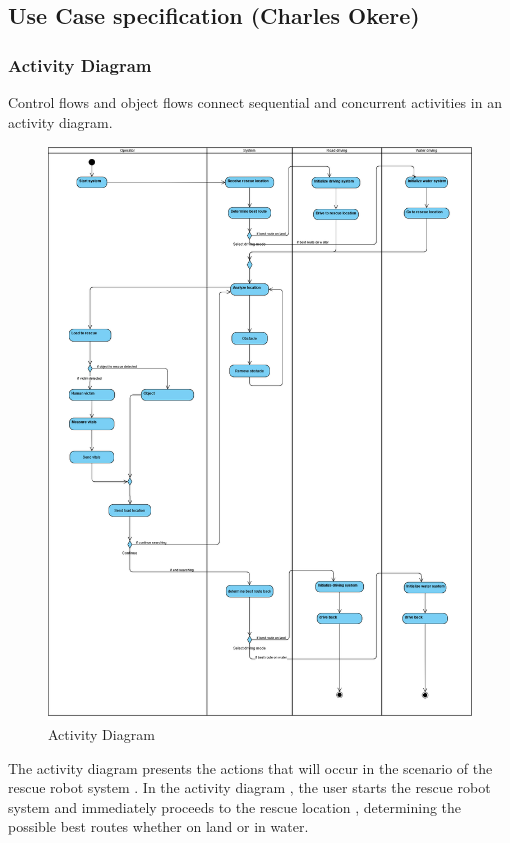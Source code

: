 \documentclass[10pt,journal,compsoc]{IEEEtran}
\begin{document}
\subsection{Use Case specification (Charles Okere)}

\subsubsection{Activity Diagram}

Control flows and object flows connect sequential and concurrent activities in an activity diagram.

\begin{figure}[h]
\includegraphics[scale=0.24]{Activity}
\caption{Activity Diagram}
\label{fig:activity}
\end{figure}

The activity diagram presents the actions that will occur in the scenario of the rescue robot system . In the activity diagram , the user starts the rescue robot system and immediately proceeds to the rescue location , determining the possible best routes whether on land or in water.
\end{document}
